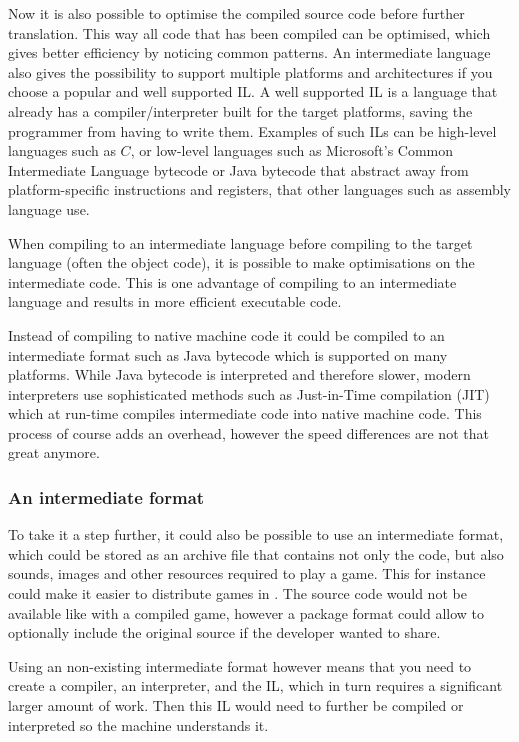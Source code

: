 

Now it is also possible to optimise the compiled source code before
further translation. This way all
code that has been compiled can be optimised, which gives better
efficiency by noticing common patterns. An intermediate language also
gives the possibility to support multiple platforms and architectures
if you choose a popular and well supported IL. A well supported IL is a
language that already has a compiler/interpreter built for the target
platforms, saving the programmer from having to write them. Examples
of such ILs can be high-level languages such as $C$, or low-level
languages such as Microsoft's Common Intermediate Language bytecode or
Java bytecode that abstract away from platform-specific instructions and
registers, that other languages such as assembly language use.

When compiling to an intermediate language before compiling to the target
language (often the object code), it is possible to make optimisations on the
intermediate code. This is one advantage of compiling to an intermediate
language and results in more efficient executable code.

Instead of compiling to native machine code it could be compiled to an
intermediate format such as Java bytecode which is supported on many platforms.
While Java bytecode is interpreted and therefore slower, modern interpreters
use sophisticated methods such as Just-in-Time compilation (JIT) which at
run-time compiles intermediate code into native machine code. This process of
course adds an overhead, however the speed differences are not that great
anymore. \cite{java-speed}

\subsubsection{An intermediate format}
To take it a step further, it could also be possible to use an
intermediate format, which could be stored as an archive file that
contains not only the code, but also sounds, images and other resources
required to play a game. This for instance could make it easier to
distribute games in \productname{}. The source code would not be
available like with a compiled game, however a package format could
allow to optionally include the original source if the developer wanted
to share.

Using an non-existing intermediate format however means that you need to
create a compiler, an interpreter, and the IL, which in turn requires a
significant larger amount of work. Then this IL would need to further be
compiled or interpreted so the machine understands it.


